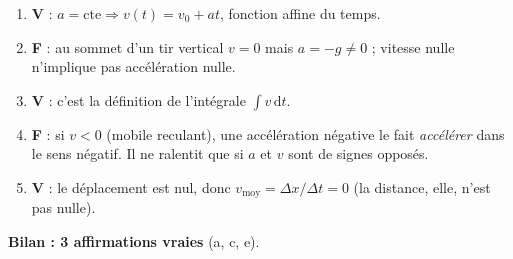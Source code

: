 \documentclass[11pt,a4paper]{article}
\begin{document}
\begin{corrige}
\begin{enumerate}[label=\alph*)]
  \item \textbf{V} : $a=\text{cte}\Rightarrow v(t)=v_0+at$, fonction affine du temps.
  \item \textbf{F} : au sommet d'un tir vertical $v=0$ mais $a=-g\neq0$ ; vitesse nulle n'implique pas accélération nulle.
  \item \textbf{V} : c'est la définition de l'intégrale $\int v\,\mathrm{d}t$.
  \item \textbf{F} : si $v<0$ (mobile reculant), une accélération négative le fait \emph{accélérer} dans le sens négatif. Il ne ralentit que si $a$ et $v$ sont de signes opposés.
  \item \textbf{V} : le déplacement est nul, donc $v_{\text{moy}}=\Delta x/\Delta t=0$ (la distance, elle, n'est pas nulle).
\end{enumerate}
\textbf{Bilan : 3 affirmations vraies} (a, c, e).
\end{corrige}
\end{document}
